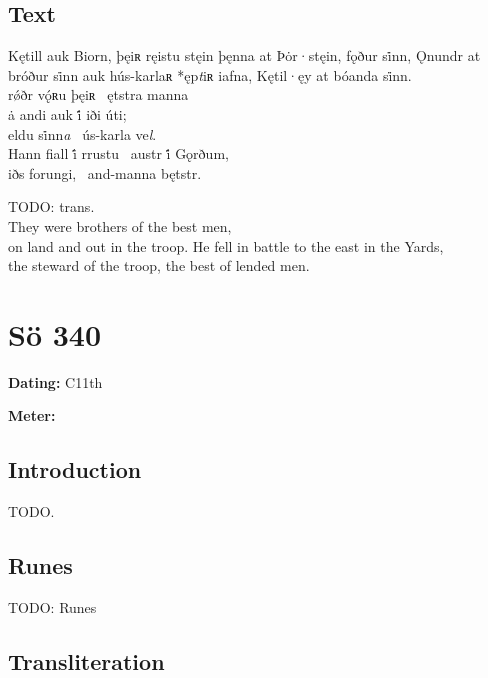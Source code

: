 \subsection{Text}

\bpg\bpa[0]%
\startsub Kętill auk Biorn, þęiʀ ręistu stęin þęnna at Þȯr·stęin, fǫður si̇nn, Ǫnundr at bróður si̇nn auk hús-karlaʀ *ęp\emph{t}iʀ iafna, Kętil·ęy at bóanda si̇nn.\endsub \\
rǿðr vǫ́ʀu þęiʀ \hld\ ętstra manna \\
\ind ȧ andi auk i̇́ iði úti; \\
eldu si̇nn\emph{a} \hld\ ús-karla ve\emph{l}. \\
Hann fiall i̇́ rrustu \hld\ austr i̇́ Gǫrðum, \\
iðs forungi, \hld\ and-manna bętstr. \epa

\bpb TODO: trans. \\
They were brothers of the best men, \\
\ind on land and out in the troop.
He fell in battle to the east in the Yards, \\
the steward of the troop, the best of lended men.\epb\epg

\sectionline\clearpage


\section{Sö 340}

\begin{flushright}%
\textbf{Dating:} C11th

\textbf{Meter:} \Fornyrdislag
\end{flushright}%

\subsection{Introduction}

TODO.

\subsection{Runes}

TODO: Runes%

\subsection{Transliteration}

